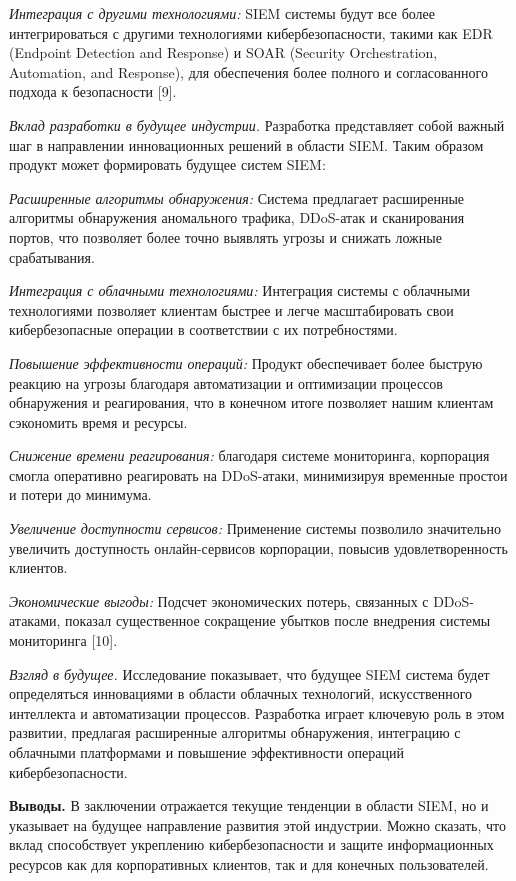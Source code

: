 \emph{Интеграция с другими технологиями:} SIEM системы будут все более
интегрироваться с другими технологиями кибербезопасности, такими как EDR
(Endpoint Detection and Response) и SOAR (Security Orchestration,
Automation, and Response), для обеспечения более полного и
согласованного подхода к безопасности {[}9{]}.

\emph{Вклад разработки в будущее индустрии.} Разработка представляет
собой важный шаг в направлении инновационных решений в области SIEM.
Таким образом продукт может формировать будущее систем SIEM:

\emph{Расширенные алгоритмы обнаружения:} Система предлагает расширенные
алгоритмы обнаружения аномального трафика, DDoS-атак и сканирования
портов, что позволяет более точно выявлять угрозы и снижать ложные
срабатывания.

\emph{Интеграция с облачными технологиями:} Интеграция системы с
облачными технологиями позволяет клиентам быстрее и легче масштабировать
свои кибербезопасные операции в соответствии с их потребностями.

\emph{Повышение эффективности операций:} Продукт обеспечивает более
быструю реакцию на угрозы благодаря автоматизации и оптимизации
процессов обнаружения и реагирования, что в конечном итоге позволяет
нашим клиентам сэкономить время и ресурсы.

\emph{Снижение времени реагирования:} благодаря системе мониторинга,
корпорация смогла оперативно реагировать на DDoS-атаки, минимизируя
временные простои и потери до минимума.

\emph{Увеличение доступности сервисов:} Применение системы позволило
значительно увеличить доступность онлайн-сервисов корпорации, повысив
удовлетворенность клиентов.

\emph{Экономические выгоды:} Подсчет экономических потерь, связанных с
DDoS-атаками, показал существенное сокращение убытков после внедрения
системы мониторинга {[}10{]}.

\emph{Взгляд в будущее.} Исследование показывает, что будущее SIEM
система будет определяться инновациями в области облачных технологий,
искусственного интеллекта и автоматизации процессов. Разработка играет
ключевую роль в этом развитии, предлагая расширенные алгоритмы
обнаружения, интеграцию с облачными платформами и повышение
эффективности операций кибербезопасности.

\textbf{Выводы.} В заключении отражается текущие тенденции в области
SIEM, но и указывает на будущее направление развития этой индустрии.
Можно сказать, что вклад способствует укреплению кибербезопасности и
защите информационных ресурсов как для корпоративных клиентов, так и для
конечных пользователей.

